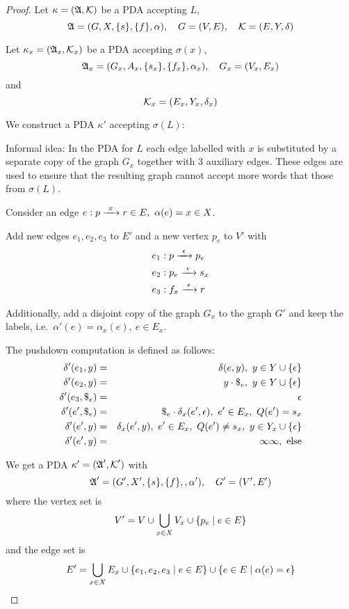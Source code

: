 \begin{proof}
Let $\kappa = (\mbox{$\mathfrak{A}$}, \mbox{$\mathcal{K}$})$ be a PDA accepting $L$,
\[ \mbox{$\mathfrak{A}$}=(G, X, \mbox{$\{s\}$}, \mbox{$\{f\}$}, \alpha),\quad G=(V,E),\quad
\mbox{$\mathcal{K}$}=(E, Y, \delta)
\]

Let $\kappa_x = (\mbox{$\mathfrak{A}$}_x, \mbox{$\mathcal{K}$}_x)$ be a PDA accepting $\sigma(x)$,
\[ \mbox{$\mathfrak{A}$}_x = (G_x, A_x, \mbox{$\{s_x\}$}, \mbox{$\{f_x\}$}, \alpha_x),\quad G_x=(V_x,
E_x) \] and
\[ \mbox{$\mathcal{K}$}_x = (E_x, Y_x, \delta_x) \]

We construct a PDA $\kappa'$ accepting $\sigma(L)$:

Informal idea: In the PDA for $L$ each edge labelled with $x$ is substituted by
a separate copy of the graph $G_x$ together with 3 auxiliary edges. These edges
are used to ensure that the resulting graph cannot accept more words that those
from $\sigma(L)$.

\begin{center}

\end{center}

Consider an edge $e: p \edge{x} r \in E,\ \alpha(e)=x\in X$.

Add new edges $e_1, e_2, e_3$ to $E'$ and a new vertex $p_e$ to $V'$ with
\begin{eqnarray*}
& e_1: p \xrightarrow{\ {\epsilon}\ } p_e \\
& e_2: p_e \xrightarrow{\ {\epsilon}\ } s_x \\
& e_3: f_x \xrightarrow{\ {\epsilon}\ } r
\end{eqnarray*}

Additionally, add a disjoint copy of the graph $G_x$ to the graph $G'$ and keep
the labels, i.e.\ $\alpha'(e) = \alpha_x(e),\ e\in E_x$.

The pushdown computation is defined as follows:
\begin{eqnarray*}
\delta'(e_1, y) &=& \delta(e, y),\ y\in Y\cup\setof{\epsilon} \\
\delta'(e_2, y) &=& y \cdot {\$}_e,\ y\in Y\cup\setof{\epsilon} \\
\delta'(e_3, {\$}_e) &=& \epsilon \\
\delta'(e', {\$}_e) &=& {\$}_e \cdot \delta_x(e', \epsilon),\ e'\in E_x,\ Q(e')
=s_x \\
\delta'(e', y) &=& \delta_x(e', y),\ e'\in E_x,\ Q(e')\neq s_x,\ y\in Y_x \cup
\setof{\epsilon} \\
\delta'(e', y) &=& \infty\infty,\text{ else}
\end{eqnarray*}

We get a PDA $\kappa' = (\mbox{$\mathfrak{A}$}', \mbox{$\mathcal{K}$}')$ with
\[ \mbox{$\mathfrak{A}$}' = (G', X', \mbox{$\{s\}$}, \mbox{$\{f\}$}, ,\alpha'),\quad G'=(V',E') \]
where the vertex set is
\[ V' = V \cup \bigcup_{x \in X} V_x \cup \mbox{$\{p_e \mid e \in E\}$} \]
and the edge set is
\[ E' = \bigcup_{x \in X} E_x \cup \mbox{$\{e_1, e_2, e_3 \mid e \in E\}$} \cup
\mbox{$\{e \in E \mid \alpha(e) = \epsilon\}$} \]


\end{proof}

